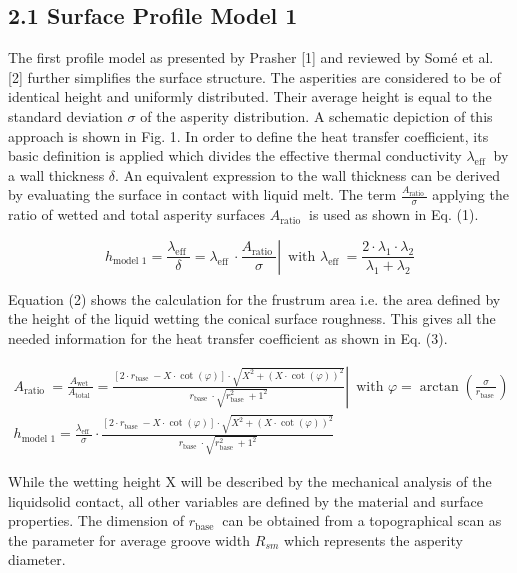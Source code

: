 \documentclass[10pt]{article}
\begin{document}
\subsection*{2.1 Surface Profile Model 1}
The first profile model as presented by Prasher [1] and reviewed by Somé et al. [2] further simplifies the surface structure. The asperities are considered to be of identical height and uniformly distributed. Their average height is equal to the standard deviation $\sigma$ of the asperity distribution. A schematic depiction of this approach is shown in Fig. 1. In order to define the heat transfer coefficient, its basic definition is applied which divides the effective thermal conductivity $\lambda_{\text {eff }}$ by a wall thickness $\delta$. An equivalent expression to the wall thickness can be derived by evaluating the surface in contact with liquid melt. The term $\frac{A_{\text {ratio }}}{\sigma}$ applying the ratio of wetted and total asperity surfaces $A_{\text {ratio }}$ is used as shown in Eq. (1).


\begin{equation*}
\left.h_{\text {model } 1}=\frac{\lambda_{\text {eff }}}{\delta}=\lambda_{\text {eff }} \cdot \frac{A_{\text {ratio }}}{\sigma} \right\rvert\, \text { with } \lambda_{\text {eff }}=\frac{2 \cdot \lambda_{1} \cdot \lambda_{2}}{\lambda_{1}+\lambda_{2}} \tag{1}
\end{equation*}


Equation (2) shows the calculation for the frustrum area i.e. the area defined by the height of the liquid wetting the conical surface roughness. This gives all the needed information for the heat transfer coefficient as shown in Eq. (3).


\begin{gather*}
\left.A_{\text {ratio }}=\frac{A_{\text {wet }}}{A_{\text {total }}}=\frac{\left[2 \cdot r_{\text {base }}-X \cdot \cot (\varphi)\right] \cdot \sqrt{X^{2}+(X \cdot \cot (\varphi))^{2}}}{r_{\text {base }} \cdot \sqrt{r_{\text {base }}^{2}+1^{2}}} \right\rvert\, \text { with } \varphi=\arctan \left(\frac{\sigma}{r_{\text {base }}}\right)  \tag{2}\\
h_{\text {model } 1}=\frac{\lambda_{\text {eff }}}{\sigma} \cdot \frac{\left[2 \cdot r_{\text {base }}-X \cdot \cot (\varphi)\right] \cdot \sqrt{X^{2}+(X \cdot \cot (\varphi))^{2}}}{r_{\text {base }} \cdot \sqrt{r_{\text {base }}^{2}+1^{2}}} \tag{3}
\end{gather*}


While the wetting height $\mathrm{X}$ will be described by the mechanical analysis of the liquidsolid contact, all other variables are defined by the material and surface properties. The dimension of $r_{\text {base }}$ can be obtained from a topographical scan as the parameter for average groove width $R_{s m}$ which represents the asperity diameter.
\end{document}

